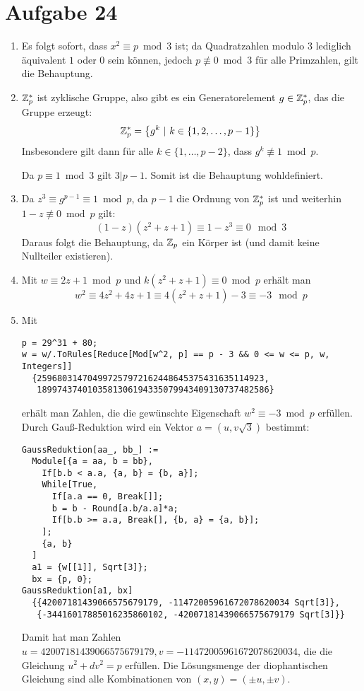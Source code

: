 \section*{Aufgabe 24}
\begin{enumerate}[(1)]
	\item Es folgt sofort, dass $x^2 \equiv p\bmod 3$ ist; da Quadratzahlen
	modulo $3$ lediglich äquivalent $1$ oder $0$ sein können, jedoch $p
	\not\equiv 0\bmod 3$ für alle Primzahlen, gilt die Behauptung.
	
	\item $\mathbb{Z}_p^*$ ist zyklische Gruppe, also gibt es ein Generatorelement
	$g \in \mathbb{Z}_p^*$, das die Gruppe erzeugt:
	\[ \mathbb{Z}_p^* = \left\{g^k\ \vert\ k \in \{1,2,\dots,p-1\}\right\} \]
	Insbesondere gilt dann für alle $k \in \{1,\dots,p-2\}$, dass $g^k
	\not\equiv 1\bmod p$.

	Da $p \equiv 1\bmod 3$ gilt $3 \vert p-1$. Somit ist die Behauptung
	wohldefiniert.

	\item Da $z^3 \equiv g^{p-1} \equiv 1\bmod p$, da $p-1$ die Ordnung von
	$\mathbb{Z}_p^*$ ist und weiterhin $1-z \not\equiv 0\bmod p$ gilt:
	\[ (1-z)(z^2+z+1) \equiv 1-z^3 \equiv 0\mod 3\]
	Daraus folgt die Behauptung, da $\mathbb{Z}_p$ ein Körper ist (und damit keine
	Nullteiler existieren).

	\item Mit $w \equiv 2 z + 1 \bmod p$ und $k ( z^2 + z + 1) \equiv 0 \bmod p$ erhält man
	\[ w^2 \equiv 4 z^2 + 4 z + 1 \equiv 4 (z^2 + z + 1) - 3 \equiv -3 \mod p\]

	\item Mit 
	\begin{lstlisting}
p = 29^31 + 80;
w = w/.ToRules[Reduce[Mod[w^2, p] == p - 3 && 0 <= w <= p, w, Integers]]
  {259680314704997257972162448645375431635114923,
   1899743740103581306194335079943409130737482586}
	\end{lstlisting}
	erhält man Zahlen, die die gewünschte Eigenschaft $w^2 \equiv -3 \bmod
	p$ erfüllen.
	Durch Gauß-Reduktion wird ein Vektor $a = (u, v \sqrt{3})$ bestimmt:
\begin{lstlisting}
GaussReduktion[aa_, bb_] := 
  Module[{a = aa, b = bb}, 
    If[b.b < a.a, {a, b} = {b, a}];
    While[True,
      If[a.a == 0, Break[]];
      b = b - Round[a.b/a.a]*a;
      If[b.b >= a.a, Break[], {b, a} = {a, b}];
    ];
    {a, b}
  ]
  a1 = {w[[1]], Sqrt[3]};
  bx = {p, 0};
GaussReduktion[a1, bx]
  {{42007181439066575679179, -11472005961672078620034 Sqrt[3]}, 
   {-34416017885016235860102, -42007181439066575679179 Sqrt[3]}}
\end{lstlisting}
	Damit hat man Zahlen $u = 42007181439066575679179, v =
	-11472005961672078620034$, die die Gleichung $u^2 + d v^2 = p$
	erfüllen. Die Lösungsmenge der diophantischen Gleichung sind alle
	Kombinationen von $(x,y) = (\pm u, \pm v)$.
\end{enumerate}

